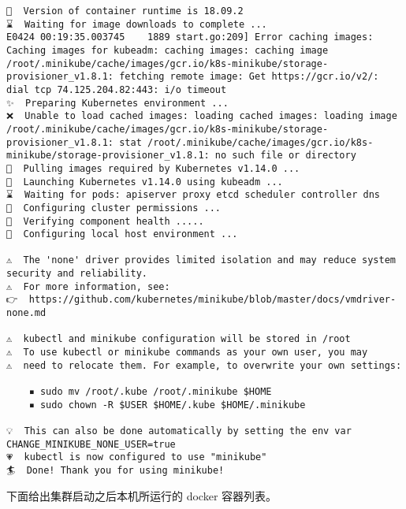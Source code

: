 \begin{lstlisting}
🐳  Version of container runtime is 18.09.2
⌛  Waiting for image downloads to complete ...
E0424 00:19:35.003745    1889 start.go:209] Error caching images:  Caching images for kubeadm: caching images: caching image /root/.minikube/cache/images/gcr.io/k8s-minikube/storage-provisioner_v1.8.1: fetching remote image: Get https://gcr.io/v2/: dial tcp 74.125.204.82:443: i/o timeout
✨  Preparing Kubernetes environment ...
❌  Unable to load cached images: loading cached images: loading image /root/.minikube/cache/images/gcr.io/k8s-minikube/storage-provisioner_v1.8.1: stat /root/.minikube/cache/images/gcr.io/k8s-minikube/storage-provisioner_v1.8.1: no such file or directory
🚜  Pulling images required by Kubernetes v1.14.0 ...
🚀  Launching Kubernetes v1.14.0 using kubeadm ... 
⌛  Waiting for pods: apiserver proxy etcd scheduler controller dns
🔑  Configuring cluster permissions ...
🤔  Verifying component health .....
🤹  Configuring local host environment ...

⚠️  The 'none' driver provides limited isolation and may reduce system security and reliability.
⚠️  For more information, see:
👉  https://github.com/kubernetes/minikube/blob/master/docs/vmdriver-none.md

⚠️  kubectl and minikube configuration will be stored in /root
⚠️  To use kubectl or minikube commands as your own user, you may
⚠️  need to relocate them. For example, to overwrite your own settings:

    ▪ sudo mv /root/.kube /root/.minikube $HOME
    ▪ sudo chown -R $USER $HOME/.kube $HOME/.minikube

💡  This can also be done automatically by setting the env var CHANGE_MINIKUBE_NONE_USER=true
💗  kubectl is now configured to use "minikube"
🏄  Done! Thank you for using minikube!
\end{lstlisting}

下面给出集群启动之后本机所运行的 docker 容器列表。

